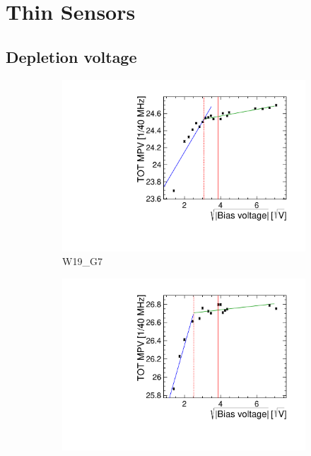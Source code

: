 \chapter{Thin Sensors}
\label{sec:appendix_ThinSensors}

\section{Depletion voltage}

\begin{figure}[htbp] \centering
  \begin{subfigure}[b]{0.33\textwidth}
    \includegraphics[width=\textwidth]{./figures/TestBeam/depletionVoltage_W0019_G07.pdf}
    \caption{W19\_G7}
  \end{subfigure} \hfill
  \begin{subfigure}[b]{0.33\textwidth}
    \includegraphics[width=\textwidth]{./figures/TestBeam/depletionVoltage_W0019_F07.pdf}

\end{subfigure}
\end{figure}
